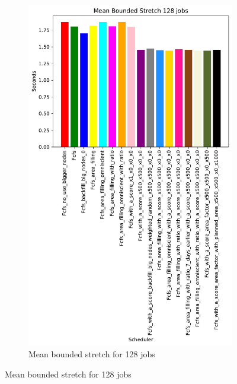 \documentclass[a4paper]{article}
\begin{document}
\begin{figure}[H]
\begin{subfigure}[b]{0.4\linewidth}\centering\includegraphics[width=0.7\linewidth]{MBSS/plot/Results_Size_And_Data_2022-02-02->2022-02-03_V9532_Mean_Stretch_With_a_Minimum_128_450_128_32_256_4_1024.pdf}\caption{Mean bounded stretch for 128 jobs}\label{45}\end{subfigure}

\end{figure}
\end{document}
